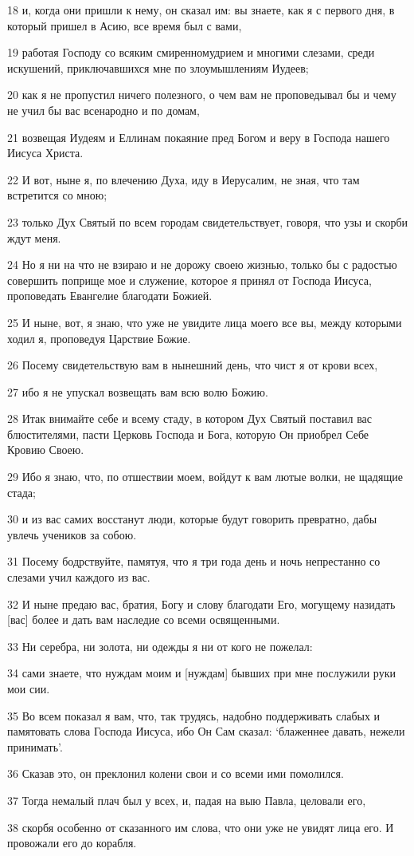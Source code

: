 \par 18 и, когда они пришли к нему, он сказал им: вы знаете, как я с первого дня, в который пришел в Асию, все время был с вами,
\par 19 работая Господу со всяким смиренномудрием и многими слезами, среди искушений, приключавшихся мне по злоумышлениям Иудеев;
\par 20 как я не пропустил ничего полезного, о чем вам не проповедывал бы и чему не учил бы вас всенародно и по домам,
\par 21 возвещая Иудеям и Еллинам покаяние пред Богом и веру в Господа нашего Иисуса Христа.
\par 22 И вот, ныне я, по влечению Духа, иду в Иерусалим, не зная, что там встретится со мною;
\par 23 только Дух Святый по всем городам свидетельствует, говоря, что узы и скорби ждут меня.
\par 24 Но я ни на что не взираю и не дорожу своею жизнью, только бы с радостью совершить поприще мое и служение, которое я принял от Господа Иисуса, проповедать Евангелие благодати Божией.
\par 25 И ныне, вот, я знаю, что уже не увидите лица моего все вы, между которыми ходил я, проповедуя Царствие Божие.
\par 26 Посему свидетельствую вам в нынешний день, что чист я от крови всех,
\par 27 ибо я не упускал возвещать вам всю волю Божию.
\par 28 Итак внимайте себе и всему стаду, в котором Дух Святый поставил вас блюстителями, пасти Церковь Господа и Бога, которую Он приобрел Себе Кровию Своею.
\par 29 Ибо я знаю, что, по отшествии моем, войдут к вам лютые волки, не щадящие стада;
\par 30 и из вас самих восстанут люди, которые будут говорить превратно, дабы увлечь учеников за собою.
\par 31 Посему бодрствуйте, памятуя, что я три года день и ночь непрестанно со слезами учил каждого из вас.
\par 32 И ныне предаю вас, братия, Богу и слову благодати Его, могущему назидать [вас] более и дать вам наследие со всеми освященными.
\par 33 Ни серебра, ни золота, ни одежды я ни от кого не пожелал:
\par 34 сами знаете, что нуждам моим и [нуждам] бывших при мне послужили руки мои сии.
\par 35 Во всем показал я вам, что, так трудясь, надобно поддерживать слабых и памятовать слова Господа Иисуса, ибо Он Сам сказал: `блаженнее давать, нежели принимать'.
\par 36 Сказав это, он преклонил колени свои и со всеми ими помолился.
\par 37 Тогда немалый плач был у всех, и, падая на выю Павла, целовали его,
\par 38 скорбя особенно от сказанного им слова, что они уже не увидят лица его. И провожали его до корабля.

